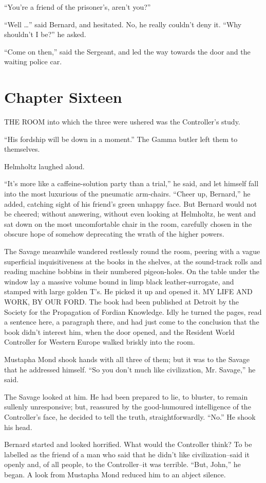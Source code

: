 \documentclass[12pt]{report}
\newcommand{\mychapter}[2]{
\setcounter{chapter}{#1}
    \setcounter{section}{0}
    \chapter*{#2}
    \addcontentsline{toc}{chapter}{#2}
}
\begin{document}
``You're a friend of the prisoner's, aren't you?''

``Well \ldots{}'' said Bernard, and hesitated. No, he really couldn't
deny it. ``Why shouldn't I be?'' he asked.

``Come on then,'' said the Sergeant, and led the way towards the door
and the waiting police car.

\mychapter{16}{Chapter Sixteen}
THE ROOM into which the three were ushered was the Controller's study.

``His fordship will be down in a moment.'' The Gamma butler left them to
themselves.

Helmholtz laughed aloud.

``It's more like a caffeine-solution party than a trial,'' he said, and
let himself fall into the most luxurious of the pneumatic arm-chairs.
``Cheer up, Bernard,'' he added, catching sight of his friend's green
unhappy face. But Bernard would not be cheered; without answering,
without even looking at Helmholtz, he went and sat down on the most
uncomfortable chair in the room, carefully chosen in the obscure hope of
somehow deprecating the wrath of the higher powers.

The Savage meanwhile wandered restlessly round the room, peering with a
vague superficial inquisitiveness at the books in the shelves, at the
sound-track rolls and reading machine bobbins in their numbered
pigeon-holes. On the table under the window lay a massive volume bound
in limp black leather-surrogate, and stamped with large golden T's. He
picked it up and opened it. MY LIFE AND WORK, BY OUR FORD. The book had
been published at Detroit by the Society for the Propagation of Fordian
Knowledge. Idly he turned the pages, read a sentence here, a paragraph
there, and had just come to the conclusion that the book didn't interest
him, when the door opened, and the Resident World Controller for Western
Europe walked briskly into the room.

Mustapha Mond shook hands with all three of them; but it was to the
Savage that he addressed himself. ``So you don't much like civilization,
Mr. Savage,'' he said.

The Savage looked at him. He had been prepared to lie, to bluster, to
remain sullenly unresponsive; but, reassured by the good-humoured
intelligence of the Controller's face, he decided to tell the truth,
straightforwardly. ``No.'' He shook his head.

Bernard started and looked horrified. What would the Controller think?
To be labelled as the friend of a man who said that he didn't like
civilization--said it openly and, of all people, to the Controller--it
was terrible. ``But, John,'' he began. A look from Mustapha Mond reduced
him to an abject silence.
\end{document}
